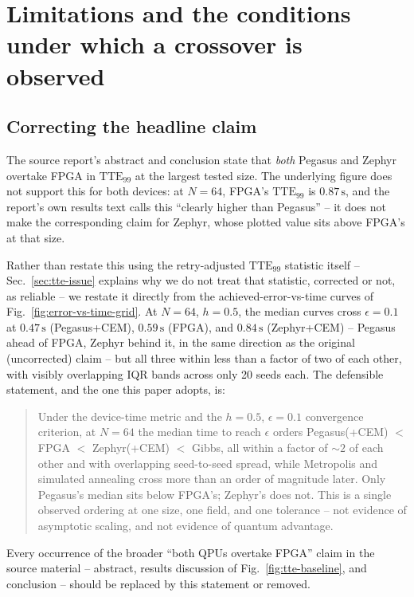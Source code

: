 \section{Limitations and the conditions under which a crossover is observed}
\label{sec:limitations}

\subsection{Correcting the headline claim}
\label{sec:headline}

The source report's abstract and conclusion state that \emph{both} Pegasus and Zephyr overtake FPGA in $\mathrm{TTE}_{99}$ at the largest tested size. The underlying figure does not support this for both devices: at $N=64$, FPGA's $\mathrm{TTE}_{99}$ is $0.87\,\mathrm s$, and the report's own results text calls this ``clearly higher than Pegasus'' -- it does not make the corresponding claim for Zephyr, whose plotted value sits above FPGA's at that size.

Rather than restate this using the retry-adjusted $\mathrm{TTE}_{99}$ statistic itself -- Sec.~\ref{sec:tte-issue} explains why we do not treat that statistic, corrected or not, as reliable -- we restate it directly from the achieved-error-vs-time curves of Fig.~\ref{fig:error-vs-time-grid}. At $N=64$, $h=0.5$, the median curves cross $\epsilon=0.1$ at $0.47\,\mathrm s$ (Pegasus+CEM), $0.59\,\mathrm s$ (FPGA), and $0.84\,\mathrm s$ (Zephyr+CEM) -- Pegasus ahead of FPGA, Zephyr behind it, in the same direction as the original (uncorrected) claim -- but all three within less than a factor of two of each other, with visibly overlapping IQR bands across only 20 seeds each. The defensible statement, and the one this paper adopts, is:

\begin{quote}
Under the device-time metric and the $h=0.5$, $\epsilon=0.1$ convergence criterion, at $N=64$ the median time to reach $\epsilon$ orders Pegasus(+CEM) $<$ FPGA $<$ Zephyr(+CEM) $<$ Gibbs, all within a factor of $\sim\!2$ of each other and with overlapping seed-to-seed spread, while Metropolis and simulated annealing cross more than an order of magnitude later. Only Pegasus's median sits below FPGA's; Zephyr's does not. This is a single observed ordering at one size, one field, and one tolerance -- not evidence of asymptotic scaling, and not evidence of quantum advantage.
\end{quote}

Every occurrence of the broader ``both QPUs overtake FPGA'' claim in the source material -- abstract, results discussion of Fig.~\ref{fig:tte-baseline}, and conclusion -- should be replaced by this statement or removed.

